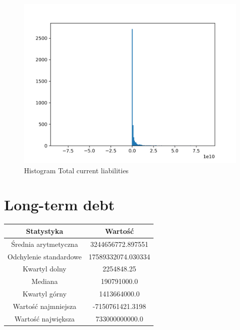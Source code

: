 \documentclass{article}
\begin{document}
\begin{figure}[h!]
    \includegraphics[width=\linewidth]{variables/Total current liabilities.png}
    \caption{Histogram Total current liabilities }
\end{figure}\section{ Long-term debt }

\begin{center}
    \begin{tabular}{|c | c|} 
    \hline
    Statystyka & Wartość \\
    \hline\hline
    Średnia arytmetyczna & 3244656772.897551 \\ 
    \hline
    Odchylenie standardowe & 17589332074.030334 \\
    \hline
    Kwartyl dolny & 2254848.25 \\
    \hline
    Mediana & 190791000.0 \\
    \hline
    Kwartyl górny & 1413664000.0 \\
    \hline
    Wartość najmniejsza & -7150761421.3198 \\
    \hline
    Wartość największa & 733000000000.0 \\
    \hline
   \end{tabular}
\end{center}
\end{document}

